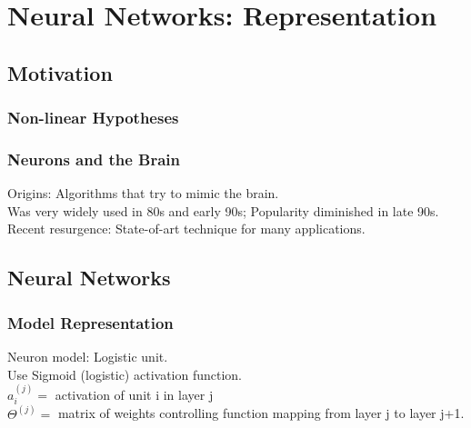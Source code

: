 \documentclass{article}
\begin{document}
\newpage

\section{Neural Networks: Representation}
\subsection{Motivation}
\subsubsection{Non-linear Hypotheses}
\subsubsection{Neurons and the Brain}
Origins: Algorithms that try to mimic the brain. \\
Was very widely used in 80s and early 90s; Popularity diminished in late 90s. \\
Recent resurgence: State-of-art technique for many applications.

\subsection{Neural Networks}
\subsubsection{Model Representation}
Neuron model: Logistic unit. \\
Use Sigmoid (logistic) activation function. \\

$a_i^{(j)} = $ activation of unit i in layer j\\
$\Theta^{(j)} = $ matrix of weights controlling function mapping from layer j to layer j+1.\\

\\
\end{document}
